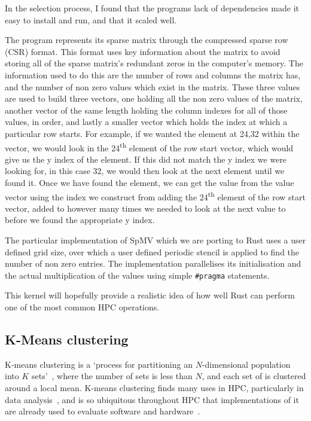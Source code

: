 In the selection process, I found that the programs lack of dependencies made it easy to install and run, and that it scaled well.

The program represents its sparse matrix through the compressed sparse row (CSR) format. This format uses key information about the matrix to avoid storing all of the sparse matrix's redundant zeros in the computer's memory. The information used to do this are the number of rows and columns the matrix has, and the number of non zero values which exist in the matrix. These three values are used to build three vectors, one holding all the non zero values of the matrix, another vector of the same length holding the column indexes for all of those values, in order, and lastly a smaller vector which holds the index at which a particular row starts. For example, if we wanted the element at 24,32 within the vector, we would look in the 24\textsuperscript{th} element of the row start vector, which would give us the y index of the element. If this did not match the y index we were looking for, in this case 32, we would then look at the next element until we found it. Once we have found the element, we can get the value from the value vector using the index we construct from adding the 24\textsuperscript{th} element of the row start vector, added to however many times we needed to look at the next value to before we found the appropriate y index.

The particular implementation of SpMV which we are porting to Rust uses a user defined grid size, over which a user defined periodic stencil is applied to find the number of non zero entries. The implementation parallelises its initialisation and the actual multiplication of the values using simple \texttt{\#pragma} statements.

This kernel will hopefully provide a realistic idea of how well Rust can perform one of the most common HPC operations.

\subsection{K-Means clustering}

K-means clustering is a `process for partitioning an $N$-dimensional population into $K$ sets'~\cite{macqueen1967}, where the number of sets is less than $N$, and each set of is clustered around a local mean. K-means clustering finds many uses in HPC, particularly in data analysis~\cite{DBLP:journals/corr/ChakrabortyND14a, ordovas2014fast}, and is so ubiquitous throughout HPC that implementations of it are already used to evaluate software and hardware~\cite{Yang2014}.

